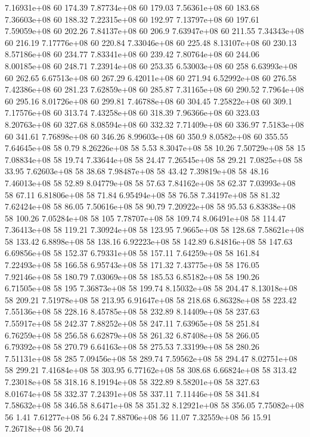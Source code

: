 7.16931e+08 60 174.39
7.87734e+08 60 179.03
7.56361e+08 60 183.68
7.36603e+08 60 188.32
7.22315e+08 60 192.97
7.13797e+08 60 197.61
7.59059e+08 60 202.26
7.84137e+08 60 206.9
7.63947e+08 60 211.55
7.34343e+08 60 216.19
7.17776e+08 60 220.84
7.33046e+08 60 225.48
8.13107e+08 60 230.13
8.57186e+08 60 234.77
7.83341e+08 60 239.42
7.80764e+08 60 244.06
8.00185e+08 60 248.71
7.23914e+08 60 253.35
6.53003e+08 60 258
6.63993e+08 60 262.65
6.67513e+08 60 267.29
6.42011e+08 60 271.94
6.52992e+08 60 276.58
7.42386e+08 60 281.23
7.62859e+08 60 285.87
7.31165e+08 60 290.52
7.7964e+08 60 295.16
8.01726e+08 60 299.81
7.46788e+08 60 304.45
7.25822e+08 60 309.1
7.17576e+08 60 313.74
7.43258e+08 60 318.39
7.96366e+08 60 323.03
8.20763e+08 60 327.68
8.08594e+08 60 332.32
7.71409e+08 60 336.97
7.5183e+08 60 341.61
7.76898e+08 60 346.26
8.99603e+08 60 350.9
8.0582e+08 60 355.55
7.64645e+08 58 0.79
8.26226e+08 58 5.53
8.3047e+08 58 10.26
7.50729e+08 58 15
7.08834e+08 58 19.74
7.33644e+08 58 24.47
7.26545e+08 58 29.21
7.0825e+08 58 33.95
7.62603e+08 58 38.68
7.98487e+08 58 43.42
7.39819e+08 58 48.16
7.46013e+08 58 52.89
8.04779e+08 58 57.63
7.84162e+08 58 62.37
7.03993e+08 58 67.11
6.81806e+08 58 71.84
6.95494e+08 58 76.58
7.34197e+08 58 81.32
7.62424e+08 58 86.05
7.50616e+08 58 90.79
7.20922e+08 58 95.53
6.83838e+08 58 100.26
7.05284e+08 58 105
7.78707e+08 58 109.74
8.06491e+08 58 114.47
7.36413e+08 58 119.21
7.30924e+08 58 123.95
7.9665e+08 58 128.68
7.58621e+08 58 133.42
6.8898e+08 58 138.16
6.92223e+08 58 142.89
6.84816e+08 58 147.63
6.69856e+08 58 152.37
6.79331e+08 58 157.11
7.64259e+08 58 161.84
7.22493e+08 58 166.58
6.95743e+08 58 171.32
7.43775e+08 58 176.05
7.92146e+08 58 180.79
7.03069e+08 58 185.53
6.85182e+08 58 190.26
6.71505e+08 58 195
7.36873e+08 58 199.74
8.15032e+08 58 204.47
8.13018e+08 58 209.21
7.51978e+08 58 213.95
6.91647e+08 58 218.68
6.86328e+08 58 223.42
7.55136e+08 58 228.16
8.45785e+08 58 232.89
8.14409e+08 58 237.63
7.55917e+08 58 242.37
7.88252e+08 58 247.11
7.63965e+08 58 251.84
6.76259e+08 58 256.58
6.62879e+08 58 261.32
6.87408e+08 58 266.05
6.79392e+08 58 270.79
6.64163e+08 58 275.53
7.33199e+08 58 280.26
7.51131e+08 58 285
7.09456e+08 58 289.74
7.59562e+08 58 294.47
8.02751e+08 58 299.21
7.41684e+08 58 303.95
6.77162e+08 58 308.68
6.66824e+08 58 313.42
7.23018e+08 58 318.16
8.19194e+08 58 322.89
8.58201e+08 58 327.63
8.01674e+08 58 332.37
7.24391e+08 58 337.11
7.11446e+08 58 341.84
7.58632e+08 58 346.58
8.6471e+08 58 351.32
8.12921e+08 58 356.05
7.75082e+08 56 1.41
7.61277e+08 56 6.24
7.88706e+08 56 11.07
7.32559e+08 56 15.91
7.26718e+08 56 20.74
